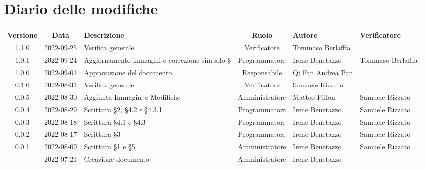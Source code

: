 \section*{Diario delle modifiche}
	\begin{center}
	\renewcommand{\arraystretch}{1.8} %
	\begin{longtable}{ |c|c|p{8em}|c|m{5em}|m{6em}| }
	\hline
	\textbf{Versione} & \textbf{Data} & \textbf{Descrizione} &  \textbf{Ruolo} &  \textbf{Autore} & \textbf{Verificatore}\\ %
	\hline %
	1.1.0 & 2022-09-25 & Verifica generale & Verificatore & Tommaso \newline Berlafffa & \\ 
	\hline
  1.0.1 & 2022-09-24 & Aggiornamento immagini e correzione simbolo § & Programmatore & Irene \newline Benetazzo & Tommaso \newline Berlafffa \\ 
	\hline
	1.0.0& 2022-09-01 & Approvazione del documento & Responsabile & Qi Fan Andrea \newline Pan & \\ 	
	\hline
	0.1.0& 2022-08-31 & Verifica generale & Verificatore & Samuele \newline Rizzato & \\ 
	\hline
	0.0.5& 2022-08-30 & Aggiunta Immagini e Modifiche & Amministratore & Matteo \newline Pillon & Samuele \newline Rizzato\\ 
	\hline
	0.0.4& 2022-08-29 & Scrittura §2, §4.2 e §4.3.1 & Programmatore & Irene \newline Benetazzo & Samuele \newline Rizzato\\ 
	\hline
	0.0.3& 2022-08-18 & Scrittura §4.1 e §4.3 & Programmatore & Irene \newline Benetazzo & Samuele \newline Rizzato\\ 
	\hline
	0.0.2& 2022-08-17 & Scrittura §3 & Programmatore & Irene \newline Benetazzo & Samuele \newline Rizzato\\ 
	\hline
	0.0.1& 2022-08-09 & Scrittura §1 e §5 & Amministratore & Irene \newline Benetazzo & Samuele \newline Rizzato\\ 
	\hline
    -& 2022-07-21 & Creazione documento & Amministratore & Irene \newline Benetazzo & \\ 
	\hline
	\end{longtable}
	\end{center}
	\newpage